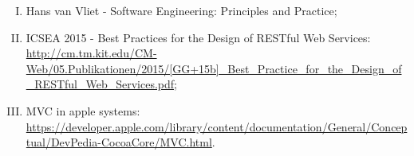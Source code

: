 \begin{enumerate}[(I)]
  \item Hans van Vliet - Software Engineering: Principles and Practice;
  \item ICSEA 2015 - Best Practices for the Design of RESTful Web Services: \url{http://cm.tm.kit.edu/CM-Web/05.Publikationen/2015/[GG+15b]_Best_Practice_for_the_Design_of_RESTful_Web_Services.pdf};
  \item MVC in apple systems: \url{https://developer.apple.com/library/content/documentation/General/Conceptual/DevPedia-CocoaCore/MVC.html}.
\end{enumerate}